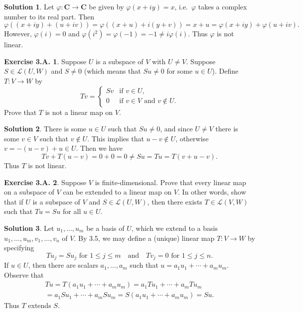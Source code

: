 \documentclass[12pt]{article}
\theoremstyle{definition}
\theoremstyle{exercise}
\newtheorem{exercise}{Exercise 3.A.}
\theoremstyle{solution}
\newtheorem*{solution}{Solution}
\newcommand{\lmap}{\mathcal{L}}
\newcommand{\quand}{\quad \text{and} \quad}
\newcommand{\C}{\mathbf{C}}
\begin{document}
\begin{solution}
    Let \( \varphi : \C \to \C \) be given by \( \varphi(x + iy) = x \), i.e.\ \( \varphi \) takes a complex number to its real part. Then
    \[
        \varphi((x + iy) + (u + iv)) = \varphi((x + u) + i(y + v)) = x + u = \varphi(x + iy) + \varphi(u + iv).
    \]
    However, \( \varphi(i) = 0 \) and \( \varphi(i^2) = \varphi(-1) = -1 \neq i \varphi(i) \). Thus \( \varphi \) is not linear.
\end{solution}

\begin{exercise}
\label{ex:10}
    Suppose \( U \) is a subspace of \( V \) with \( U \neq V \). Suppose \( S \in \lmap(U, W) \) and \( S \neq 0 \) (which means that \( Su \neq 0 \) for some \( u \in U \)). Define \( T : V \to W \) by
    \[
        Tv = \begin{cases}
            Sv & \text{if } v \in U, \\
            0 & \text{if } v \in V \text{ and } v \not\in U.
        \end{cases}
    \]
    Prove that \( T \) is not a linear map on \( V \).
\end{exercise}

\begin{solution}
    There is some \( u \in U \) such that \( Su \neq 0 \), and since \( U \neq V \) there is some \( v \in V \) such that \( v \not\in U \). This implies that \( u - v \not\in U \), otherwise \( v = -(u - v) + u \in U \). Then we have
    \[
        Tv + T(u - v) = 0 + 0 = 0 \neq Su = Tu = T(v + u - v).
    \]
    Thus \( T \) is not linear.
\end{solution}

\begin{exercise}
\label{ex:11}
    Suppose \( V \) is finite-dimensional. Prove that every linear map on a subspace of \( V \) can be extended to a linear map on \( V \). In other words, show that if \( U \) is a subspace of \( V \) and \( S \in \lmap(U, W) \), then there exists \( T \in \lmap(V, W) \) such that \( Tu = Su \) for all \( u \in U \).
\end{exercise}

\begin{solution}
    Let \( u_1, \ldots, u_m \) be a basis of \( U \), which we extend to a basis \( u_1, \ldots, u_m, v_1, \ldots, v_n \) of \( V \). By 3.5, we may define a (unique) linear map \( T : V \to W \) by specifying
    \[
        Tu_j = Su_j \text{ for } 1 \leq j \leq m \quand Tv_j = 0 \text{ for } 1 \leq j \leq n.
    \]
    If \( u \in U \), then there are scalars \( a_1, \ldots, a_m \) such that \( u = a_1 u_1 + \cdots + a_m u_m \). Observe that
    \begin{multline*}
        Tu = T(a_1 u_1 + \cdots + a_m u_m) = a_1 Tu_1 + \cdots + a_m Tu_m \\ = a_1 Su_1 + \cdots + a_m Su_m = S(a_1 u_1 + \cdots + a_m u_m) = Su.
    \end{multline*}
    Thus \( T \) extends \( S \).
\end{solution}
\end{document}
